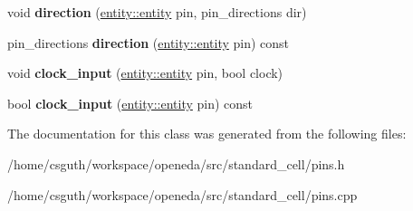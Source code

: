 \begin{DoxyCompactItemize}
\item 
\hypertarget{classophidian_1_1standard__cell_1_1pins_a928748a4cb03162aa638d276caa4fd43}{void {\bfseries direction} (\hyperlink{classophidian_1_1entity_1_1entity}{entity\-::entity} pin, pin\-\_\-directions dir)}\label{classophidian_1_1standard__cell_1_1pins_a928748a4cb03162aa638d276caa4fd43}

\item 
\hypertarget{classophidian_1_1standard__cell_1_1pins_ac91552d25e116f6a9d6346361b0eb94c}{pin\-\_\-directions {\bfseries direction} (\hyperlink{classophidian_1_1entity_1_1entity}{entity\-::entity} pin) const }\label{classophidian_1_1standard__cell_1_1pins_ac91552d25e116f6a9d6346361b0eb94c}

\item 
\hypertarget{classophidian_1_1standard__cell_1_1pins_afffd9e8574ad1acc758960391a4f4f33}{void {\bfseries clock\-\_\-input} (\hyperlink{classophidian_1_1entity_1_1entity}{entity\-::entity} pin, bool clock)}\label{classophidian_1_1standard__cell_1_1pins_afffd9e8574ad1acc758960391a4f4f33}

\item 
\hypertarget{classophidian_1_1standard__cell_1_1pins_a85c246ee2d1ec6f6dfe6eb5ae0142487}{bool {\bfseries clock\-\_\-input} (\hyperlink{classophidian_1_1entity_1_1entity}{entity\-::entity} pin) const }\label{classophidian_1_1standard__cell_1_1pins_a85c246ee2d1ec6f6dfe6eb5ae0142487}

\end{DoxyCompactItemize}


The documentation for this class was generated from the following files\-:\begin{DoxyCompactItemize}
\item 
/home/csguth/workspace/openeda/src/standard\-\_\-cell/pins.\-h\item 
/home/csguth/workspace/openeda/src/standard\-\_\-cell/pins.\-cpp\end{DoxyCompactItemize}
